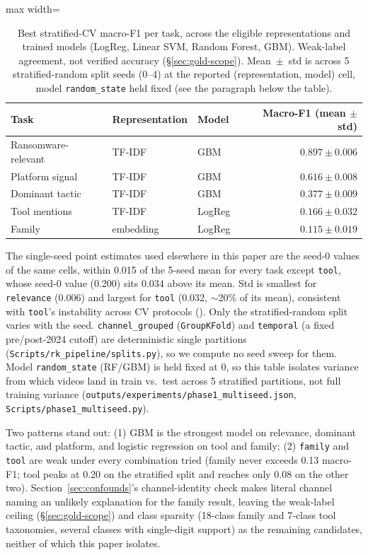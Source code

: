 \documentclass[preprint,12pt]{elsarticle}
\newenvironment{fittable}{\begin{adjustbox}{max width=\textwidth}}{\end{adjustbox}}
\begin{document}
\begin{table}[htbp]
\centering
\caption{Best stratified-CV macro-F1 per task, across the eligible
  representations and trained models (LogReg, Linear SVM, Random Forest,
  GBM). Weak-label agreement, not verified accuracy
  (\S\ref{sec:gold-scope}). Mean~$\pm$~std is across 5 stratified-random
  split seeds (0--4) at the reported (representation, model) cell, model
  \texttt{random\_state} held fixed (see the paragraph below the table).}
\label{tab:results}
\begin{fittable}
\begin{tabular}{lllr}
\toprule
Task & Representation & Model & Macro-F1 (mean $\pm$ std) \\
\midrule
Ransomware-relevant & TF-IDF     & GBM    & $0.897 \pm 0.006$ \\
Platform signal       & TF-IDF     & GBM    & $0.616 \pm 0.008$ \\
Dominant tactic      & TF-IDF     & GBM    & $0.377 \pm 0.009$ \\
Tool mentions         & TF-IDF     & LogReg & $0.166 \pm 0.032$ \\
Family                 & embedding  & LogReg & $0.115 \pm 0.019$ \\
\bottomrule
\end{tabular}
\end{fittable}
\end{table}

The single-seed point estimates used elsewhere in this paper are the seed-0
values of the same cells, within 0.015 of the 5-seed mean for every task
except \texttt{tool}, whose seed-0 value (0.200) sits 0.034 above its mean.
Std is smallest for \texttt{relevance} (0.006) and largest for \texttt{tool}
(0.032, $\sim$20\% of its mean), consistent with \texttt{tool}'s instability
across CV protocols (). Only the stratified-random
split varies with the seed. \texttt{channel\_grouped} (\texttt{GroupKFold})
and \texttt{temporal} (a fixed pre/post-2024 cutoff) are deterministic single
partitions (\texttt{Scripts/rk\_pipeline/splits.py}), so we compute no seed
sweep for them. Model \texttt{random\_state} (RF/GBM) is held fixed at 0, so
this table isolates variance from which videos land in train vs.\ test across
5 stratified partitions, not full training variance
(\texttt{outputs/experiments/phase1\_multiseed.json},
\texttt{Scripts/phase1\_multiseed.py}).

Two patterns stand out: (1) GBM is the strongest model on relevance,
dominant tactic, and platform, and logistic regression on tool and family;
(2) \texttt{family} and \texttt{tool} are weak under every combination
tried (family never exceeds 0.13 macro-F1; tool peaks at 0.20 on the
stratified split and reaches only 0.08 on the other two).
Section~\ref{sec:confounds}'s channel-identity check makes literal channel
naming an unlikely explanation for the family result, leaving the
weak-label ceiling (\S\ref{sec:gold-scope}) and class sparsity (18-class
family and 7-class tool taxonomies, several classes with single-digit
support) as the remaining candidates, neither of which this paper isolates.
\end{document}
